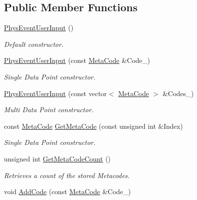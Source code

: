 \subsection*{Public Member Functions}
\begin{DoxyCompactItemize}
\item 
\hyperlink{classPhysEventUserInput_a6f8eaf698e8109d5cb30f2f17044f1ba}{PhysEventUserInput} ()
\begin{DoxyCompactList}\small\item\em Default constructor. \item\end{DoxyCompactList}\item 
\hyperlink{classPhysEventUserInput_ae13b1b02bfa3ef64dc4205478a68810f}{PhysEventUserInput} (const \hyperlink{classphys_1_1MetaCode}{MetaCode} \&Code\_\-)
\begin{DoxyCompactList}\small\item\em Single Data Point constructor. \item\end{DoxyCompactList}\item 
\hyperlink{classPhysEventUserInput_a0a9bd99d8db6f171ef3c87bd417ccc4a}{PhysEventUserInput} (const vector$<$ \hyperlink{classphys_1_1MetaCode}{MetaCode} $>$ \&Codes\_\-)
\begin{DoxyCompactList}\small\item\em Multi Data Point constructor. \item\end{DoxyCompactList}\item 
const \hyperlink{classphys_1_1MetaCode}{MetaCode} \hyperlink{classPhysEventUserInput_aa564530c27f6983bb412e46c2c7ed086}{GetMetaCode} (const unsigned int \&Index)
\begin{DoxyCompactList}\small\item\em Single Data Point constructor. \item\end{DoxyCompactList}\item 
unsigned int \hyperlink{classPhysEventUserInput_a86df812a38566a572134100a422a8799}{GetMetaCodeCount} ()
\begin{DoxyCompactList}\small\item\em Retrieves a count of the stored Metacodes. \item\end{DoxyCompactList}\item 
void \hyperlink{classPhysEventUserInput_a4f5b94c64cd08c15b480e441d25a385d}{AddCode} (const \hyperlink{classphys_1_1MetaCode}{MetaCode} \&Code\_\-)

\end{DoxyCompactItemize}
